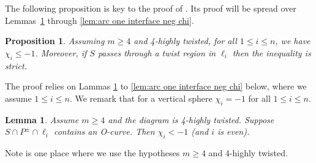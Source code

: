 \documentclass[12pt,reqno]{amsart}
\theoremstyle{plain}
\newtheorem{proposition}[theorem]{Proposition}
\newtheorem{lemma}[theorem]{Lemma}
\theoremstyle{definition}
\begin{document}
The following proposition is key to the proof of . 
Its proof will be spread over Lemmas~\ref{lem:Ocurve neg chi} through 
\ref{lem:arc one interface neg chi}. 

\begin{proposition}\label{inequality for inbetween}
Assuming $m\geq 4$ and 4-highly twisted, for all $1\le i \le n$, we have $\chi_i\le -1$. 
Moreover, if $S$ passes through 
a twist region in $\ell_i$ then the inequality is strict.
\end{proposition}

The proof relies on Lammas \ref{lem:Ocurve neg chi} to \ref{lem:arc one interface neg chi} 
below, where we assume $1\leq i\leq n$. We remark that for a vertical sphere 
$\chi_i = -1$ for all $1\le i \le n$.

\begin{lemma}\label{lem:Ocurve neg chi}
Assume $m\geq 4$ and the diagram is 4-highly twisted. 
Suppose $S\cap P^{\pm} \cap \ell_i$ contains an O-curve. Then $\chi_i<-1$ (and $i$ is even). 
\end{lemma}

Note  is one place where we use the hypotheses $m\geq 4$ and 
$4$-highly twisted.
\end{document}
